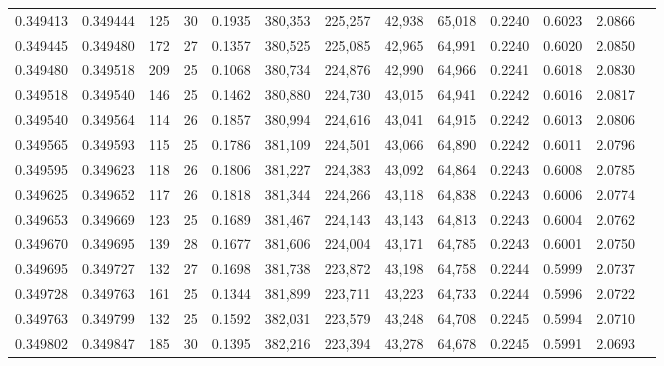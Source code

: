 \begin{tabular}{rrrrrrrrrrrrr}
0.349413 & 0.349444 &   125 &  30 &                                     0.1935 & 380,353 & 225,257 &  42,938 &  65,018 & 0.2240 & 0.6023 & 2.0866 \\
0.349445 & 0.349480 &   172 &  27 &                                     0.1357 & 380,525 & 225,085 &  42,965 &  64,991 & 0.2240 & 0.6020 & 2.0850 \\
0.349480 & 0.349518 &   209 &  25 &                                     0.1068 & 380,734 & 224,876 &  42,990 &  64,966 & 0.2241 & 0.6018 & 2.0830 \\
0.349518 & 0.349540 &   146 &  25 &                                     0.1462 & 380,880 & 224,730 &  43,015 &  64,941 & 0.2242 & 0.6016 & 2.0817 \\
0.349540 & 0.349564 &   114 &  26 &                                     0.1857 & 380,994 & 224,616 &  43,041 &  64,915 & 0.2242 & 0.6013 & 2.0806 \\
0.349565 & 0.349593 &   115 &  25 &                                     0.1786 & 381,109 & 224,501 &  43,066 &  64,890 & 0.2242 & 0.6011 & 2.0796 \\
0.349595 & 0.349623 &   118 &  26 &                                     0.1806 & 381,227 & 224,383 &  43,092 &  64,864 & 0.2243 & 0.6008 & 2.0785 \\
0.349625 & 0.349652 &   117 &  26 &                                     0.1818 & 381,344 & 224,266 &  43,118 &  64,838 & 0.2243 & 0.6006 & 2.0774 \\
0.349653 & 0.349669 &   123 &  25 &                                     0.1689 & 381,467 & 224,143 &  43,143 &  64,813 & 0.2243 & 0.6004 & 2.0762 \\
0.349670 & 0.349695 &   139 &  28 &                                     0.1677 & 381,606 & 224,004 &  43,171 &  64,785 & 0.2243 & 0.6001 & 2.0750 \\
0.349695 & 0.349727 &   132 &  27 &                                     0.1698 & 381,738 & 223,872 &  43,198 &  64,758 & 0.2244 & 0.5999 & 2.0737 \\
0.349728 & 0.349763 &   161 &  25 &                                     0.1344 & 381,899 & 223,711 &  43,223 &  64,733 & 0.2244 & 0.5996 & 2.0722 \\
0.349763 & 0.349799 &   132 &  25 &                                     0.1592 & 382,031 & 223,579 &  43,248 &  64,708 & 0.2245 & 0.5994 & 2.0710 \\
0.349802 & 0.349847 &   185 &  30 &                                     0.1395 & 382,216 & 223,394 &  43,278 &  64,678 & 0.2245 & 0.5991 & 2.0693 \\

\end{tabular}
